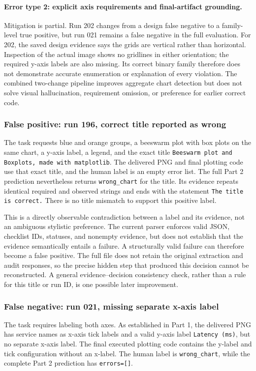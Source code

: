 \documentclass[11pt]{article}
\begin{document}
\paragraph{Error type 2: explicit axis requirements and final-artifact grounding.}
Mitigation is partial. Run 202 changes from a design false negative to a
family-level true positive, but run 021 remains a false negative in the full
evaluation. For 202, the saved design evidence says the grids are vertical
rather than horizontal. Inspection of the actual image shows no gridlines in
either orientation; the required y-axis labels are also missing. Its correct
binary family therefore does not demonstrate accurate enumeration or
explanation of every violation.
The combined two-change pipeline improves aggregate chart detection but does
not solve visual hallucination, requirement
omission, or preference for earlier correct code.

\subsubsection{False positive: run 196, correct title reported as wrong}
The task requests blue and orange groups, a beeswarm plot with box plots on
the same chart, a y-axis label, a legend, and the exact title
\texttt{Beeswarm plot and Boxplots, made with matplotlib}.
The delivered PNG and final plotting code use that exact title, and the human
label is an empty error list. The full Part 2 prediction nevertheless returns
\texttt{wrong\_chart} for the title. Its evidence repeats identical required
and observed strings and ends with the statement
\texttt{The title is correct.}
There is no title mismatch to support this positive label.

This is a directly observable contradiction between a label and its evidence,
not an ambiguous stylistic preference. The current parser enforces valid
JSON, checklist IDs, statuses, and nonempty evidence, but does not establish
that the evidence semantically entails a failure. A structurally valid
failure can therefore become a false positive. The full file does not retain
the original extraction and audit responses, so the precise hidden step that
produced this decision cannot be reconstructed.
A general evidence--decision consistency check, rather than a rule for this
title or run ID, is one possible later improvement.

\subsubsection{False negative: run 021, missing separate x-axis label}
The task requires labeling both axes. As established in Part 1, the delivered
PNG has service names as x-axis tick labels and a valid y-axis label
\texttt{Latency (ms)}, but no separate x-axis label. The final executed plotting
code contains the y-label and tick configuration without an x-label.
The human label is \texttt{wrong\_chart}, while the complete Part 2 prediction
has \texttt{errors=[]}.
\end{document}
